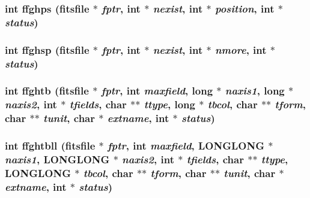 \subsubsection{\setlength{\rightskip}{0pt plus 5cm}int ffghps (\bf{fitsfile} $\ast$ {\em fptr}, int $\ast$ {\em nexist}, int $\ast$ {\em position}, int $\ast$ {\em status})}\label{test_2roimasker_2fitsio_8h_5bc2324399a2cc4c0cf179c6af73c253}


\subsubsection{\setlength{\rightskip}{0pt plus 5cm}int ffghsp (\bf{fitsfile} $\ast$ {\em fptr}, int $\ast$ {\em nexist}, int $\ast$ {\em nmore}, int $\ast$ {\em status})}\label{test_2roimasker_2fitsio_8h_72d53ce1ae759524a27f68fc55dbc9ab}


\subsubsection{\setlength{\rightskip}{0pt plus 5cm}int ffghtb (\bf{fitsfile} $\ast$ {\em fptr}, int {\em maxfield}, long $\ast$ {\em naxis1}, long $\ast$ {\em naxis2}, int $\ast$ {\em tfields}, char $\ast$$\ast$ {\em ttype}, long $\ast$ {\em tbcol}, char $\ast$$\ast$ {\em tform}, char $\ast$$\ast$ {\em tunit}, char $\ast$ {\em extname}, int $\ast$ {\em status})}\label{test_2roimasker_2fitsio_8h_31a49b3fe1b2a1e589794d420e2082fb}


\subsubsection{\setlength{\rightskip}{0pt plus 5cm}int ffghtbll (\bf{fitsfile} $\ast$ {\em fptr}, int {\em maxfield}, \bf{LONGLONG} $\ast$ {\em naxis1}, \bf{LONGLONG} $\ast$ {\em naxis2}, int $\ast$ {\em tfields}, char $\ast$$\ast$ {\em ttype}, \bf{LONGLONG} $\ast$ {\em tbcol}, char $\ast$$\ast$ {\em tform}, char $\ast$$\ast$ {\em tunit}, char $\ast$ {\em extname}, int $\ast$ {\em status})}\label{test_2roimasker_2fitsio_8h_62e73d788b8463ca174a441efd62c055}


